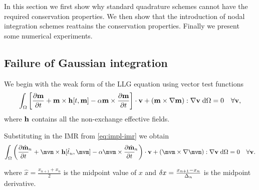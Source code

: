 In this section we first show why standard quadrature schemes cannot have the required conservation properties.
We then show that the introduction of nodal integration schemes reattains the conservation properties.
Finally we present some numerical experiments.


\subsection{Failure of Gaussian integration}

\newcommand{\midpoint}[1]{\hat{#1}}
\newsubcommand{\mvm}{\midpoint{\mv}}{n}
\newcommand{\tm}{\midpoint{t}_n}
\newcommand{\dtop}{\delta}
\newcommand{\pdsub}[3]{\mathrlap{\pd{#1\mathrlap{_{#2}}}{#3}}\phantom{\pd{#1_{#2}}{#3}}}
\newcommand{\dmdtm}{\pdsub{\midpoint{\mv}}{n}{t}}
\newcommand{\dmdtml}{\pdsub{\midpoint{\mv}}{n,l}{t}}
\newcommand{\dmdtmj}{\pdsub{\midpoint{\mv}}{n,j}{t}}

\newcommand{\ipg}[2]{\intd{{#1} \cdot {#2}}}

We begin with the weak form of the LLG equation using vector test functions
\begin{equation}
  \label{eq:weak-llg}
  {\int_{\Omega}  {\left[ \frac{\partial \mathbf{m}}{\partial t}+ \mathbf{m}\times \mathbf{h}[t, \mathbf{m}] - \alpha\mathbf{m}\times \frac{\partial \mathbf{m}}{\partial t}\right]} \cdot \mathbf{v}+ {\left( \mathbf{m}\times \nabla\mathbf{m}\right)} : \nabla\mathbf{v}{\; \text{d}}{\Omega}} = 0 \quad \forall \mathbf{v},
\end{equation}
where $\mathbf{h}$ contains all the non-exchange effective fields.


Substituting in the IMR from \eqref{eq:impl-imr} we obtain
\begin{equation}
  \label{eq:weak-llg-imr}
  \intd{\bigb{\dmdtm + \mvm \times \hv[\tm, \mvm] - \dampc \mvm \times \dmdtm} \cdot \testv
  + \bigb{\mvm \times \grad \mvm} : \grad \testv} = 0 \quad \forall \testv.
\end{equation}

where $\midpoint{x} = \frac{x_{n+1} + x_{n}}{2}$ is the midpoint value of $x$ and $\dtop x = \frac{x_{n+1} - x_n}{\dtn}$ is the midpoint derivative.

